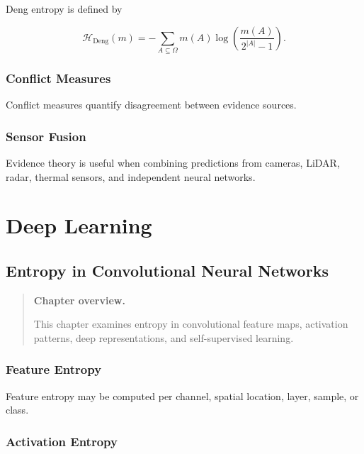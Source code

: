 \documentclass[11pt,oneside]{book}
\theoremstyle{remark}
\newcommand{\Entropy}{\mathcal{H}}
\newenvironment{chapteroverview}
{
	\begin{quote}
		\small
		\textbf{Chapter overview.}
	}
	{
	\end{quote}
}
\begin{document}
	Deng entropy is defined by
	
	\[
	\Entropy_{\mathrm{Deng}}(m)
	=
	-\sum_{A\subseteq\Omega}
	m(A)
	\log
	\left(
	\frac{m(A)}{2^{|A|}-1}
	\right).
	\]
	
	\section{Conflict Measures}
	
	Conflict measures quantify disagreement between evidence sources.
	
	\section{Sensor Fusion}
	
	Evidence theory is useful when combining predictions from cameras, LiDAR,
	radar, thermal sensors, and independent neural networks.
	
	
	\part{Deep Learning}
	
	
	\chapter{Entropy in Convolutional Neural Networks}
	\label{chap:cnn-entropy}
	
	\begin{chapteroverview}
		This chapter examines entropy in convolutional feature maps, activation
		patterns, deep representations, and self-supervised learning.
	\end{chapteroverview}
	
	\section{Feature Entropy}
	
	Feature entropy may be computed per channel, spatial location, layer, sample,
	or class.
	
	\section{Activation Entropy}
	
\end{document}
